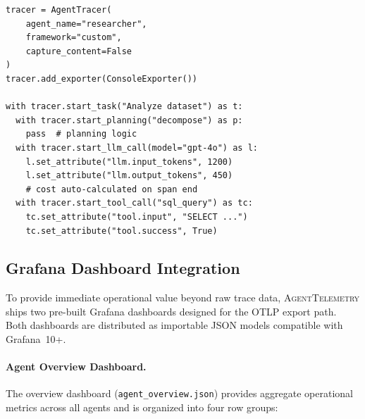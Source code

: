 \documentclass[sigconf,nonacm]{acmart}
\begin{document}
\begin{lstlisting}[caption={Direct tracing API for custom agents.
  Spans nest automatically via context managers.},
  label={lst:tracing},float=t]
tracer = AgentTracer(
    agent_name="researcher",
    framework="custom",
    capture_content=False
)
tracer.add_exporter(ConsoleExporter())

with tracer.start_task("Analyze dataset") as t:
  with tracer.start_planning("decompose") as p:
    pass  # planning logic
  with tracer.start_llm_call(model="gpt-4o") as l:
    l.set_attribute("llm.input_tokens", 1200)
    l.set_attribute("llm.output_tokens", 450)
    # cost auto-calculated on span end
  with tracer.start_tool_call("sql_query") as tc:
    tc.set_attribute("tool.input", "SELECT ...")
    tc.set_attribute("tool.success", True)
\end{lstlisting}

\subsection{Grafana Dashboard Integration}
\label{sec:dashboards}

To provide immediate operational value beyond raw trace data,
\textsc{AgentTelemetry} ships two pre-built Grafana dashboards designed
for the OTLP export path.  Both dashboards are distributed as importable
JSON models compatible with Grafana~10+.

\paragraph{Agent Overview Dashboard.}
The overview dashboard (\texttt{agent\_overview.json}) provides aggregate
operational metrics across all agents and is organized into four row
groups:
\end{document}
